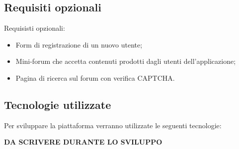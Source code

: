 \subsection{Requisiti opzionali}
Requisisti opzionali:
\begin{itemize}
    \item Form di registrazione di un nuovo utente;
    \item Mini-forum che accetta contenuti prodotti dagli utenti dell'applicazione;
    \item Pagina di ricerca sul forum con verifica CAPTCHA.
\end{itemize}

\subsection{Tecnologie utilizzate}
Per sviluppare la piattaforma verranno utilizzate le seguenti tecnologie:

\textbf{DA SCRIVERE DURANTE LO SVILUPPO}
